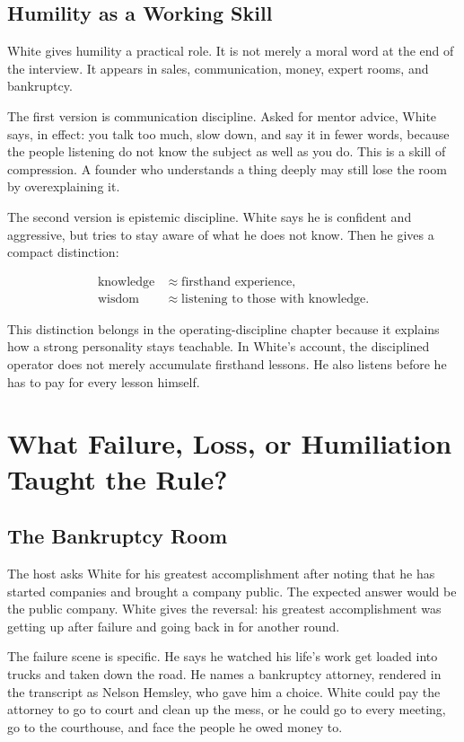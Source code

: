 \documentclass[11pt,oneside]{book}
\begin{document}
\section{Humility as a Working Skill}

White gives humility a practical role. It is not merely a moral word at the end of the interview. It appears in sales, communication, money, expert rooms, and bankruptcy.

The first version is communication discipline. Asked for mentor advice, White says, in effect: you talk too much, slow down, and say it in fewer words, because the people listening do not know the subject as well as you do. This is a skill of compression. A founder who understands a thing deeply may still lose the room by overexplaining it.

The second version is epistemic discipline. White says he is confident and aggressive, but tries to stay aware of what he does not know. Then he gives a compact distinction:

\begin{align}
\text{knowledge} &\approx \text{firsthand experience},\\
\text{wisdom} &\approx \text{listening to those with knowledge}.
\end{align}

This distinction belongs in the operating-discipline chapter because it explains how a strong personality stays teachable. In White's account, the disciplined operator does not merely accumulate firsthand lessons. He also listens before he has to pay for every lesson himself.

\chapter{What Failure, Loss, or Humiliation Taught the Rule?}

\section{The Bankruptcy Room}

The host asks White for his greatest accomplishment after noting that he has started companies and brought a company public. The expected answer would be the public company. White gives the reversal: his greatest accomplishment was getting up after failure and going back in for another round.

The failure scene is specific. He says he watched his life's work get loaded into trucks and taken down the road. He names a bankruptcy attorney, rendered in the transcript as Nelson Hemsley, who gave him a choice. White could pay the attorney to go to court and clean up the mess, or he could go to every meeting, go to the courthouse, and face the people he owed money to.
\end{document}
